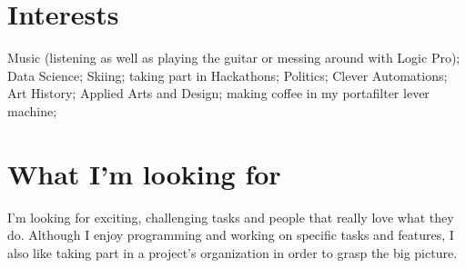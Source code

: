 \documentclass{article}
\begin{document}
\vspace{.9em}
\section{Interests}

Music (listening as well as playing the guitar or messing around with Logic Pro); Data Science; Skiing; taking part in Hackathons; Politics; Clever Automations; Art History; Applied Arts and Design; making coffee 
in my portafilter lever machine;

\vspace{.9em}
\section{What I'm looking for}
I'm looking for exciting, challenging tasks and people that really love what they do. Although I enjoy programming and working on specific tasks and features, I also like taking part in a project's organization in order to grasp the big picture. 
\end{document}
